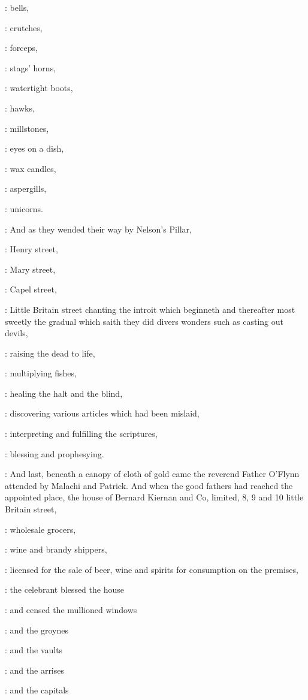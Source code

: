 :
bells,

:
crutches,

:
forceps,

:
stags' horns,

:
watertight boots,

:
hawks,

:
millstones,

:
eyes on a dish,

:
wax candles,

:
aspergills,

:
unicorns.

:
And as they wended their way by Nelson's Pillar,

:
Henry street,

:
Mary street,

:
Capel street,

:
Little Britain street
chanting the introit  which beginneth
 and thereafter most sweetly the gradual
 which saith 
they did divers wonders such as casting out devils,

:
raising the dead to life,

:
multiplying fishes,

:
healing the halt and the blind,

:
discovering various articles which had been mislaid,

:
interpreting and fulfilling the scriptures,

:
blessing and prophesying.

:
And last, beneath
a canopy of cloth of gold came the reverend Father O'Flynn attended by
Malachi and Patrick. And when the good fathers had reached the appointed place,
the house of Bernard Kiernan and Co, limited, 8, 9 and 10 little Britain street,

:
wholesale grocers,

:
wine and brandy shippers,

:
licensed for the sale of beer, wine and spirits for consumption on the premises,

:
the celebrant blessed the house

:
and censed the mullioned windows 

:
and the groynes 

:
and the vaults 

:
and the arrises 

:
and the capitals 

